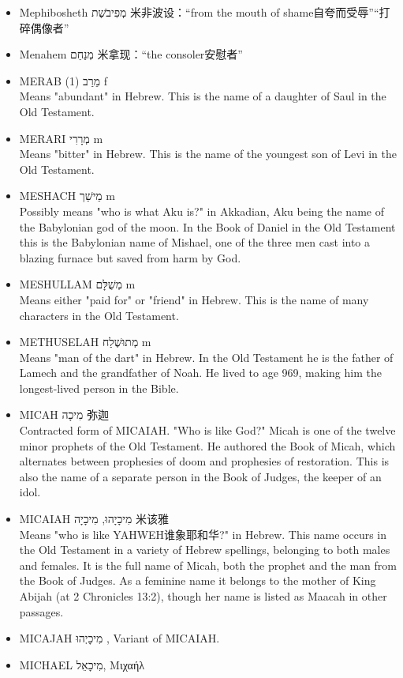 \begin{itemize}
\item Mephibosheth מְפִיבֹשֶׁת 米非波设：“from the mouth of shame自夸而受辱”“打碎偶像者”
\item Menahem מְנַחֵם‎ 米拿现：“the consoler安慰者”
\item MERAB (1) מֵרַב f \\
Means "abundant" in Hebrew. This is the name of a daughter of Saul in the Old Testament.
\item MERARI מְרָרִי m \\
Means "bitter" in Hebrew. This is the name of the youngest son of Levi in the Old Testament.
\item MESHACH מֵישַׁך m \\
Possibly means "who is what Aku is?" in Akkadian, Aku being the name of the Babylonian god of the moon. In the Book of Daniel in the Old Testament this is the Babylonian name of Mishael, one of the three men cast into a blazing furnace but saved from harm by God.
\item MESHULLAM מְשֻׁלָּם m \\
Means either "paid for" or "friend" in Hebrew. This is the name of many characters in the Old Testament.
\item METHUSELAH מְתוּשֶׁלַח m \\
Means "man of the dart" in Hebrew. In the Old Testament he is the father of Lamech and the grandfather of Noah. He lived to age 969, making him the longest-lived person in the Bible.
\item MICAH מִיכָה 弥迦\\
Contracted form of MICAIAH. "Who is like God?" Micah is one of the twelve minor prophets of the Old Testament. He authored the Book of Micah, which alternates between prophesies of doom and prophesies of restoration. This is also the name of a separate person in the Book of Judges, the keeper of an idol.  
\item MICAIAH מִיכָיָהוּ, מִיכָיָה 米该雅\\
Means "who is like YAHWEH谁象耶和华?" in Hebrew. This name occurs in the Old Testament in a variety of Hebrew spellings, belonging to both males and females. It is the full name of Micah, both the prophet and the man from the Book of Judges. As a feminine name it belongs to the mother of King Abijah (at 2 Chronicles 13:2), though her name is listed as Maacah in other passages.
\item MICAJAH מִיכָיְהוּ , Variant of MICAIAH.
\item MICHAEL מִיכָאֵל, Μιχαήλ  \\

\end{itemize}
